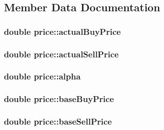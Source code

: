 \subsection{Member Data Documentation}
\hypertarget{classprice_ad5017cef2e0f61e7cca4c501daf0c8f1}{
\subsubsection[{actualBuyPrice}]{\setlength{\rightskip}{0pt plus 5cm}double {\bf price::actualBuyPrice}}}
\label{classprice_ad5017cef2e0f61e7cca4c501daf0c8f1}
\hypertarget{classprice_a56b644fc355c61a06c563e83587562f8}{
\subsubsection[{actualSellPrice}]{\setlength{\rightskip}{0pt plus 5cm}double {\bf price::actualSellPrice}}}
\label{classprice_a56b644fc355c61a06c563e83587562f8}
\hypertarget{classprice_ad71f7d198361764503defc6c0f5205eb}{
\subsubsection[{alpha}]{\setlength{\rightskip}{0pt plus 5cm}double {\bf price::alpha}}}
\label{classprice_ad71f7d198361764503defc6c0f5205eb}
\hypertarget{classprice_a9b5a8957965dbf9864e0c21f007dab1d}{
\subsubsection[{baseBuyPrice}]{\setlength{\rightskip}{0pt plus 5cm}double {\bf price::baseBuyPrice}}}
\label{classprice_a9b5a8957965dbf9864e0c21f007dab1d}
\hypertarget{classprice_a17cc243dcdc8e2de14a5365e7ce733dd}{
\subsubsection[{baseSellPrice}]{\setlength{\rightskip}{0pt plus 5cm}double {\bf price::baseSellPrice}}}
